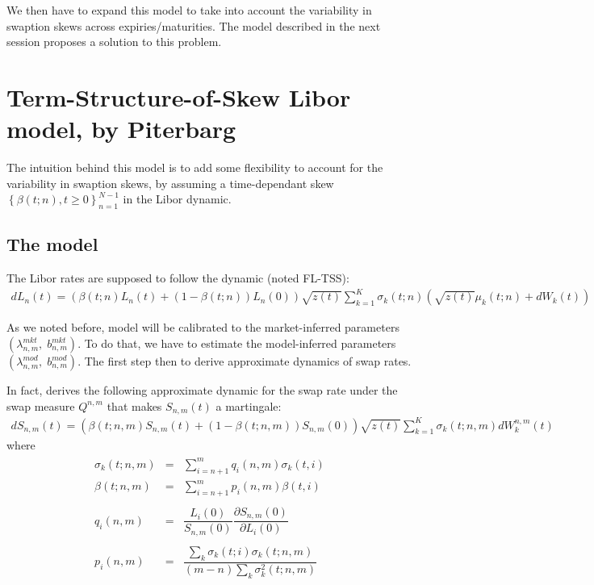 \documentclass[12pt,a4paper]{article}
\begin{document}
We then have to expand this model to take into account the variability in swaption skews across expiries/maturities. The model described in the next session proposes a solution to this problem.

\section{Term-Structure-of-Skew Libor model, by Piterbarg}

The intuition behind this model is to add some flexibility to account for the variability in swaption skews, by assuming a time-dependant skew $\left\lbrace \beta(t; n), t \geq 0 \right\rbrace_{n=1}^{N-1} $ in the Libor dynamic.

\subsection{The model}

The Libor rates are supposed to follow the dynamic (noted FL-TSS):
\begin{eqnarray}
\label{FL_TSS}
d L_n(t) = \left(\beta(t; n) L_n(t) + (1-\beta(t; n)) L_n(0)\right) \sqrt{z(t)} \sum_{k=1}^{K}\sigma_k(t; n)\left(\sqrt{z(t)}\mu_k(t; n) + dW_k(t)\right)
\end{eqnarray}

As we noted before, model will be calibrated to the market-inferred parameters $(\lambda^{mkt}_{n,m}, \; b^{mkt}_{n,m})$. To do that, we have to estimate the model-inferred parameters $(\lambda^{mod}_{n,m}, \; b^{mod}_{n,m})$. The first step then to derive approximate dynamics of swap rates.

In fact, \cite{Pit04} derives the following approximate dynamic for the swap rate under the swap measure $Q^{n,m}$ that makes $S_{n,m}(t)$ a martingale:
\begin{eqnarray}
\label{appS_FL_TSS}
d S_{n,m}(t) = \left( \beta(t;n,m) S_{n,m}(t) + (1-\beta(t;n,m))S_{n,m}(0)\right)  \sqrt{z(t)} \sum_{k=1}^{K}
\sigma_k(t;n,m) dW^{n,m}_k(t) 
\end{eqnarray}
where 
\begin{eqnarray*}
\begin{array}{rll}
   \sigma_k(t;n,m) &=& \displaystyle\sum_{i=n+1}^{m} q_i(n,m) \sigma_k(t,i)\\
   \beta(t;n,m) &=& \displaystyle\sum_{i=n+1}^{m} p_i(n,m) \beta(t,i)\\\\
   q_i(n,m) &=& \dfrac{L_i(0)}{S_{n,m}(0)} \dfrac{\partial S_{n,m}(0)}{\partial L_i(0)} \\\\
   p_i(n,m) &=& \dfrac{\sum_{k} \sigma_k(t;i) \sigma_k(t;n,m)}{(m-n)\sum_{k} \sigma_k^2(t;n,m)}
\end{array}
\end{eqnarray*}
\end{document}
